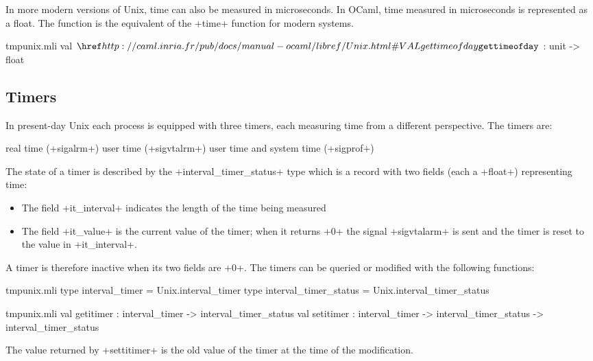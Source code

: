 In more modern versions of Unix, time can also be measured in microseconds.
In OCaml, time measured in microseconds is represented as a float.  
The  function is the equivalent of the \ml+time+ 
function for modern systems.

%
\begin{listingcodefile}{tmpunix.mli}
val $\libvalue{Unix}{gettimeofday}$ : unit -> float
\end{listingcodefile}

\subsection*{Timers}
In present-day Unix each process is equipped with three timers, each
measuring time from a different perspective.  The timers are:

%
\begin{mltypecases}
 real time (\ml+sigalrm+)
 user time (\ml+sigvtalrm+)
 user time and system time (\ml+sigprof+)
\end{mltypecases}
% 
The state of a timer is described by the \ml+interval_timer_status+
type which is a record with two fields (each a \ml+float+)
representing time:
%
\begin{itemize}
\item The field \ml+it_interval+ indicates the length of the time 
being measured
\item The field \ml+it_value+ is the current value of the timer; 
when it returns \ml+0+ the signal \ml+sigvtalarm+ is sent and 
the timer is reset to the value in \ml+it_interval+.
\end{itemize}
%
A timer is therefore inactive when its two fields are \ml+0+.  
The timers can be queried or modified with the following functions:
%
\begin{codefile}{tmpunix.mli}
type interval_timer = Unix.interval_timer
type interval_timer_status = Unix.interval_timer_status
\end{codefile}
%
\begin{listingcodefile}{tmpunix.mli}
val getitimer : interval_timer -> interval_timer_status
val setitimer : 
    interval_timer -> interval_timer_status -> interval_timer_status
\end{listingcodefile}
%

The value returned by \ml+settitimer+ is the old value of 
the timer at the time of the modification.


